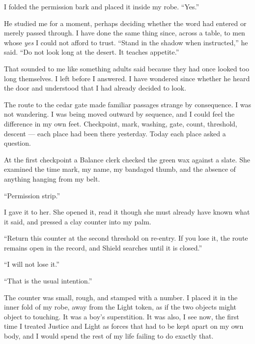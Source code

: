 I folded the permission bark and placed it inside my robe. ``Yes.''\par

He studied me for a moment, perhaps deciding whether the word had entered or merely passed through. I have done the same thing since, across a table, to men whose \textit{yes} I could not afford to trust. ``Stand in the shadow when instructed,'' he said. ``Do not look long at the desert. It teaches appetite.''\par

That sounded to me like something adults said because they had once looked too long themselves. I left before I answered. I have wondered since whether he heard the door and understood that I had already decided to look.\par

\ornament

\noindent The route to the cedar gate made familiar passages strange by consequence. I was not wandering. I was being moved outward by sequence, and I could feel the difference in my own feet. Checkpoint, mark, washing, gate, count, threshold, descent --- each place had been there yesterday. Today each place asked a question.\par

At the first checkpoint a Balance clerk checked the green wax against a slate. She examined the time mark, my name, my bandaged thumb, and the absence of anything hanging from my belt.\par

``Permission strip.''\par

I gave it to her. She opened it, read it though she must already have known what it said, and pressed a clay counter into my palm.\par

``Return this counter at the second threshold on re-entry. If you lose it, the route remains open in the record, and Shield searches until it is closed.''\par

``I will not lose it.''\par

``That is the usual intention.''\par

The counter was small, rough, and stamped with a number. I placed it in the inner fold of my robe, away from the Light token, as if the two objects might object to touching. It was a boy's superstition. It was also, I see now, the first time I treated Justice and Light as forces that had to be kept apart on my own body, and I would spend the rest of my life failing to do exactly that.\par

